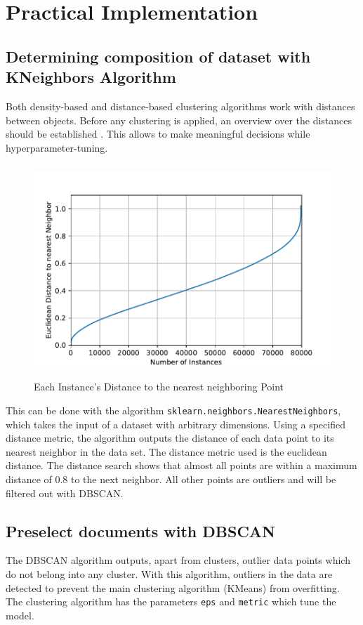 \section{Practical Implementation}

\subsection{Determining composition of dataset with KNeighbors Algorithm}


Both density-based and distance-based clustering algorithms work with distances between objects. Before any clustering is applied, an overview over the distances should be established \cite{maklinDBSCANPythonExample2022a}. This allows to make meaningful decisions while hyperparameter-tuning.

 \begin{figure}[!h]
	\centering
	\includegraphics[height=8cm]{Bilder/models/kneighbors.pdf}
	\caption{Each Instance's Distance to the nearest neighboring Point}
	\label{fig:dbscan-plot}
\end{figure}

This can be done with the algorithm \lstinline|sklearn.neighbors.NearestNeighbors|, which takes the input of a dataset with arbitrary dimensions. Using a specified distance metric, the algorithm outputs the distance of each data point to its nearest neighbor in the data set. The distance metric used is the euclidean distance.
The distance search shows that almost all points are within a maximum distance of 0.8 to the next neighbor. All other points are outliers and will be filtered out with \ac{DBSCAN}.



\subsection{Preselect documents with \ac{DBSCAN}}
The \ac{DBSCAN} algorithm outputs, apart from clusters, outlier data points which do not belong into any cluster. With this algorithm, outliers in the data are detected to prevent the main clustering algorithm (KMeans) from overfitting. 
The clustering algorithm has the parameters \lstinline|eps| and \lstinline|metric| which tune the model.

